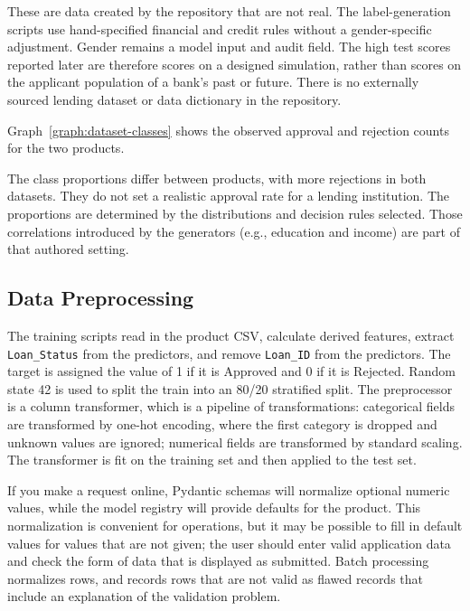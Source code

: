 These are data created by the repository that are not real. The label-generation scripts use hand-specified financial and credit rules without a gender-specific adjustment. Gender remains a model input and audit field. The high test scores reported later are therefore scores on a designed simulation, rather than scores on the applicant population of a bank's past or future. There is no externally sourced lending dataset or data dictionary in the repository.

Graph~\ref{graph:dataset-classes} shows the observed approval and rejection counts for the two products.

The class proportions differ between products, with more rejections in both datasets. They do not set a realistic approval rate for a lending institution. The proportions are determined by the distributions and decision rules selected. Those correlations introduced by the generators (e.g., education and income) are part of that authored setting.


\subsection{Data Preprocessing}
The training scripts read in the product CSV, calculate derived features, extract \texttt{Loan\_Status} from the predictors, and remove \texttt{Loan\_ID} from the predictors. The target is assigned the value of 1 if it is Approved and 0 if it is Rejected. Random state 42 is used to split the train into an 80/20 stratified split. The preprocessor is a column transformer, which is a pipeline of transformations: categorical fields are transformed by one-hot encoding, where the first category is dropped and unknown values are ignored; numerical fields are transformed by standard scaling. The transformer is fit on the training set and then applied to the test set.

If you make a request online, Pydantic schemas will normalize optional numeric values, while the model registry will provide defaults for the product. This normalization is convenient for operations, but it may be possible to fill in default values for values that are not given; the user should enter valid application data and check the form of data that is displayed as submitted. Batch processing normalizes rows, and records rows that are not valid as flawed records that include an explanation of the validation problem.


